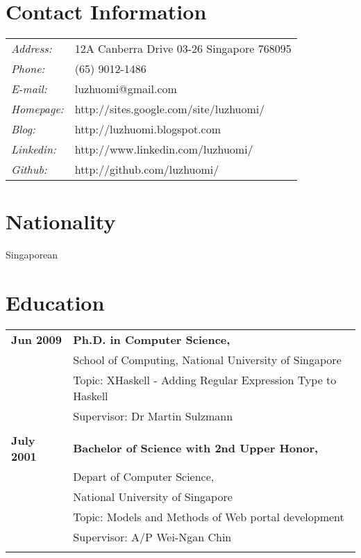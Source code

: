 \documentclass[margin,line]{res}
\begin{document}


\begin{resume}
\section{\sc Contact Information}
\vspace{.05in}
\begin{tabular}{@{}p{1in}p{4in}}
{\it Address:} & 12A Canberra Drive 03-26 Singapore 768095 \\
{\it Phone:} &  (65) 9012-1486 \\            
{\it E-mail:} &  luzhuomi@gmail.com \\         
{\it Homepage:} & http://sites.google.com/site/luzhuomi/\\     
{\it Blog:} & http://luzhuomi.blogspot.com \\
{\it Linkedin:} & http://www.linkedin.com/luzhuomi/  \\
{\it Github:} & http://github.com/luzhuomi/
\end{tabular}

\section{\sc Nationality}
Singaporean


\section{\sc Education} 
\begin{tabular}{ll}
 {\bf Jun 2009}  & {\bf Ph.D. in Computer Science, } \\ 
		       & School of Computing, National University of Singapore \\ 
		       & Topic: XHaskell - Adding Regular Expression Type to Haskell \\ 
		       & Supervisor: Dr Martin Sulzmann \\ \\
 {\bf July 2001} & {\bf Bachelor of Science with 2nd Upper Honor,} \\ 
		       & Depart of Computer Science, \\
		       & National University of Singapore \\ 
		       & Topic: Models and Methods of Web portal development \\ 
		       & Supervisor: A/P Wei-Ngan Chin \\ \\
\end{tabular}




\end{resume}
\end{document}
